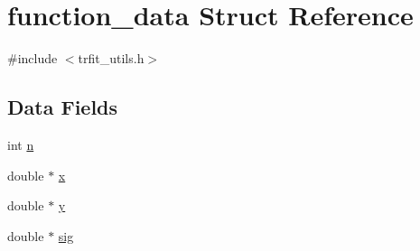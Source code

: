 \hypertarget{structfunction__data}{
\section{function\_\-data Struct Reference}
\label{structfunction__data}
}


{\ttfamily \#include $<$trfit\_\-utils.h$>$}\subsection*{Data Fields}
\begin{DoxyCompactItemize}
\item 
int \hyperlink{structfunction__data_a0344e578f42804cd3da588a53e722da5}{n}
\item 
double $\ast$ \hyperlink{structfunction__data_abd64c58c97715724b8fea9b82b7bece9}{x}
\item 
double $\ast$ \hyperlink{structfunction__data_aa3b2c9fd92e83663cdd62d8188f596d3}{y}
\item 
double $\ast$ \hyperlink{structfunction__data_a10dfdbe7cbd739c676bc2acdfc32d71e}{sig}
\end{DoxyCompactItemize}



